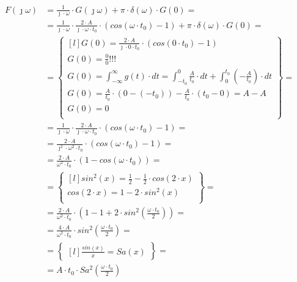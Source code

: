 \begin{task}
\begin{align*}
F(\jmath \omega)&= \frac{1}{\jmath \cdot \omega} \cdot G(\jmath \omega) + \pi \cdot \delta(\omega) \cdot G(0)=\\
&=\frac{1}{\jmath \cdot \omega} \cdot \frac{2 \cdot A}{\jmath \cdot \omega \cdot t_{0}} \cdot \left(cos(\omega \cdot t_{0}) -1\right) + \pi \cdot \delta(\omega) \cdot G(0)=\\
&=\begin{Bmatrix*}[l]
G(0)=\frac{2 \cdot A}{\jmath \cdot 0 \cdot t_{0}} \cdot \left(cos(0 \cdot t_{0}) -1\right)\\
G(0)=\frac{0}{0}!!!\\
G(0)=\int_{-\infty}^{\infty} g(t) \cdot dt=\int_{-t_{0}}^{0} \frac{A}{t_{0}} \cdot dt+\int_{0}^{t_{0}} (-\frac{A}{t_{0}}) \cdot dt\\
G(0)=\frac{A}{t_{0}} \cdot (0 -(-t_{0}))-\frac{A}{t_{0}} \cdot (t_{0} - 0)= A- A\\
G(0)=0\\
\end{Bmatrix*}=\\
&=\frac{1}{\jmath \cdot \omega} \cdot \frac{2 \cdot A}{\jmath \cdot \omega \cdot t_{0}} \cdot \left(cos(\omega \cdot t_{0}) -1\right)=\\
&=\frac{2 \cdot A}{\jmath^{2} \cdot \omega^{2} \cdot t_{0}} \cdot \left(cos(\omega \cdot t_{0}) -1\right)=\\
&=\frac{2 \cdot A}{\omega^{2} \cdot t_{0}} \cdot \left(1 - cos(\omega \cdot t_{0})\right)=\\
&=\begin{Bmatrix*}[l]
sin^{2}(x)= \frac{1}{2}-\frac{1}{2} \cdot cos(2 \cdot x)\\
cos(2 \cdot x)= 1 - 2 \cdot sin^{2}(x)\\
\end{Bmatrix*}=\\
&=\frac{2 \cdot A}{\omega^{2} \cdot t_{0}} \cdot \left(1 - 1 + 2 \cdot sin^{2}\left(\frac{\omega \cdot t_{0}}{2}\right)\right)=\\
&=\frac{4 \cdot A}{\omega^{2} \cdot t_{0}} \cdot sin^{2}\left(\frac{\omega \cdot t_{0}}{2}\right)=\\
&=\begin{Bmatrix*}[l]
\frac{sin(x)}{x}=Sa(x)
\end{Bmatrix*}=\\
&=A \cdot t_{0} \cdot Sa^{2}(\frac{\omega \cdot t_{0}}{2})
\end{align*}


\end{task}
